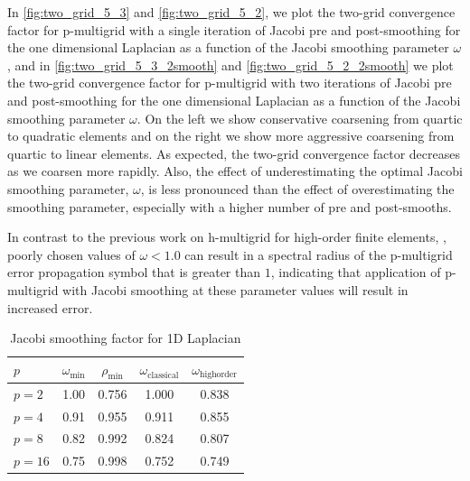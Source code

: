 \documentclass[review]{siamart190516}
\begin{document}
In \cref{fig:two_grid_5_3} and \cref{fig:two_grid_5_2}, we plot the two-grid convergence factor for p-multigrid with a single iteration of Jacobi pre and post-smoothing for the one dimensional Laplacian as a function of the Jacobi smoothing parameter $\omega$,
and in \cref{fig:two_grid_5_3_2smooth} and \cref{fig:two_grid_5_2_2smooth} we plot the two-grid convergence factor for p-multigrid with two iterations of Jacobi pre and post-smoothing for the one dimensional Laplacian as a function of the Jacobi smoothing parameter $\omega$.
On the left we show conservative coarsening from quartic to quadratic elements and on the right we show more aggressive coarsening from quartic to linear elements.
As expected, the two-grid convergence factor decreases as we coarsen more rapidly.
Also, the effect of underestimating the optimal Jacobi smoothing parameter, $\omega$, is less pronounced than the effect of overestimating the smoothing parameter, especially with a higher number of pre and post-smooths.

In contrast to the previous work on h-multigrid for high-order finite elements, \cite{he2020two}, poorly chosen values of $\omega < 1.0$ can result in a spectral radius of the p-multigrid error propagation symbol that is greater than $1$, indicating that application of p-multigrid with Jacobi smoothing at these parameter values will result in increased error.

\begin{table}[ht!]
\begin{center}
\begin{tabular}{l c c c c}
  \toprule
  $p$       &  $\omega_{\min}$  &  $\rho_{\min}$  &  $\omega_{\text{classical}}$  &  $\omega_{\text{highorder}}$  \\
  \midrule
  $p = 2$   &  1.00  &  0.756  & 1.000  &  0.838  \\
  $p = 4$   &  0.91  &  0.955  & 0.911  &  0.855  \\
  $p = 8$   &  0.82  &  0.992  & 0.824  &  0.807  \\
  $p = 16$  &  0.75  &  0.998  & 0.752  &  0.749  \\
  \bottomrule
\end{tabular}
\end{center}
\caption{Jacobi smoothing factor for 1D Laplacian}
\label{table:smoothing_factor_1d_jacobi}
\end{table}
\end{document}
